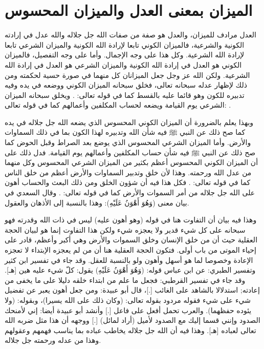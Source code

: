 \section{الميزان بمعنى العدل والميزان المحسوس}

 العدل مرادف للميزان، والعدل هو صفة من صفات الله جل جلاله والله عدل في إرادته الكونية والشرعية، فالميزان الكوني تابعا لإرادة الله الكونية والميزان الشرعي تابعا لإرادة الله الشرعية. وكل هذا على وجه الإجمال. وأما على وجه التفصيل، فالميزان الكوني هو العدل في إرادة الله الكونية والميزان الشرعي هو العدل في إرادة الله الشرعية. ولكن الله عز وجل جعل الميزانان كل منهما في صورة حسية لحكمته ومن ذلك لإظهار عدله سبحانه تعالى، فخلق سبحانه الميزان الكوني ووضعه في يده وفيه تدبيره للكون وهو قائما عليه بالقسط كما في قوله تعالى:
\quranayah*[3][18]{\footnotesize \surahname*[3]}. ويخلق سبحانه الميزان الشرعي يوم القيامة ويضعه لحساب المكلفين وأعمالهم كما في قوله تعالى: 
\quranayah*[21][47]{\footnotesize \surahname*[21]}.

وبهذا يعلم بالضرورة أن الميزان الكوني المحسوس الذي يضعه الله جل جلاله في يده كما صح ذلك عن النبي ﷺ فيه شأن الله وتدبيره لهذا الكون بما في ذلك السماوات والأرض. وأما الميزان الشرعي المحسوس الذي يوضع بعد الصراط وقبل الحوض كما صح ذلك عن النبي ﷺ فيه شأن حساب المكلفين وأعمالهم يوم القيامة. فدل ذلك على أن الميزان الكوني المحسوس أعظم بكثير من الميزان الشرعي المحسوس وكل منهما من عدل الله ورحمته. وهذا لأن خلق وتدبير السماوات والأرض أعظم من خلق الناس كما في قوله تعالى: \quranayah*[40][57]{\footnotesize \surahname*[40]}. فكل هذا فيه أن شؤون الخلق ومن ذلك البعث والحساب أهون على الله جل جلاله من أمر السموات والأرض كما في قوله تعالى: 
\quranayah*[30][27]{\footnotesize \surahname*[30]}. وقال السعدي في بيان معنى (وَهُوَ أَهْوَنُ عَلَيْهِ): وهذا بالنسبة إلى الأذهان والعقول.

وهذا فيه بيان أن التفاوت هنا في قوله (وهو أهون عليه) ليس في ذات الله وقدرته فهو سبحانه على كل شيء قدير ولا يعجزه شيء ولكن هذا التفاوت إنما هو لبيان الحجة العقلية حيث أن من خلق الإنسان وخلق السموات والأرض وهي أكبر وأعظم، قادر على إحياء الموتى من باب أولى. فتكون الحجة العقلية هنا أن من لم يعجزه الإبتداء لا تعجزه الإعادة وخصوصا لما هو أسهل وأهون ولو بالنسبة للعقل. وقد جاء في تفسير ابن كثير وتفسير الطبري: عن ابن عباس قوله: (وَهُوَ أَهْوَنُ عَلَيْهِ) يقول: كلّ شيء عليه هين [هـ]. وقد جاء في تفسير القرطبي: فجعل ما علم من ابتداء خلقه دليلا على ما يخفى من إعادته; استدلالا بالشاهد على الغائب  [.]، قال أبو عبيدة: ومن جعل أهون يعبر عن تفضيل شيء على شيء فقوله مردود بقوله تعالى: (وكان ذلك على الله يسيرا)، وبقوله: (ولا يئوده حفظهما). والعرب تحمل أفعل على فاعل [.] وأنشد أبو عبيدة أيضا: إني لأمنحك الصدود وإنني قسما إليك مع الصدود لأميل (أراد لمائل) [.] ووجهه أن هذا مثل ضربه الله تعالى لعباده [هـ]. وهذا فيه أن الله جل جلاله يخاطب عباده بما يناسب فهمهم وعقولهم وهذا من عدله ورحمته جل جلاله.

